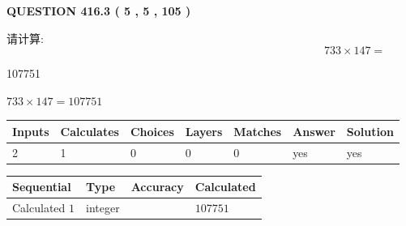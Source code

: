 \documentclass{ctexart}
\begin{document}
   
  
\vspace{0.2in}
  
{\textbf{\Large{QUESTION
416.3 
 ( 5 , 5 , 105 )
}}}
  
  
 
请计算:
\begin{equation}
733  \times    %
147 = \nonumber
\end{equation}
 
 
 
\noindent{}
 
 

107751
 
 
\noindent{}
 
 

 
 
 
\noindent{}
 
 

$ %
733 \times  %
147=   %
107751$
 
 
\noindent{}
 
 

 
   
   
   
   
\noindent\begin{tabular}{|l|l|l|l|l|l|l|}
 \hline
Inputs & Calculates & Choices & Layers & Matches & Answer & Solution \\ \hline
 2  & 
 1  & 
 0
  & 
 0  & 
 0  & 
  yes & 
  yes 
  \\ \hline
 \end{tabular}
   
   
   
   
\noindent{}
   
   
  
  
\noindent\begin{tabular}{|l|l|l|l|}
\hline
 Sequential & Type & Accuracy & Calculated \\ 
\hline
 
 
  Calculated $  1 $ & integer &  & 
  $ 107751 $ 
 \\  \hline  
 \end{tabular}
   
\end{document}
